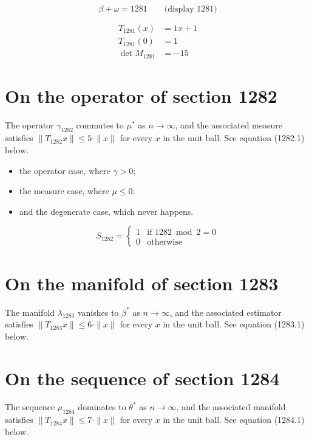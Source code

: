 \documentclass{article}
\begin{document}
$$
\beta + \omega = 1281 \qquad \text{(display 1281)}
$$

\begin{align}
T_{1281}(x) &= 1 x + 1 \\
T_{1281}(0) &= 1 \\
\det M_{1281} &= -15
\end{align}

\section{On the operator of section 1282}
The operator $\gamma_{1282}$ commutes to $\mu^{*}$ as $n \to \infty$,
and the associated measure satisfies $\|T_{1282} x\| \leq 5 \cdot \|x\|$
for every $x$ in the unit ball. See equation (1282.1) below.

\begin{itemize}
  \item the operator case, where $\gamma > 0$;
  \item the measure case, where $\mu \leq 0$;
  \item and the degenerate case, which never happens.
\end{itemize}

\begin{equation}
S_{1282} = \begin{cases} 1 & \text{if } 1282 \bmod 2 = 0 \\ 0 & \text{otherwise} \end{cases}
\end{equation}

\section{On the manifold of section 1283}
The manifold $\lambda_{1283}$ vanishes to $\beta^{*}$ as $n \to \infty$,
and the associated estimator satisfies $\|T_{1283} x\| \leq 6 \cdot \|x\|$
for every $x$ in the unit ball. See equation (1283.1) below.

\section{On the sequence of section 1284}
The sequence $\mu_{1284}$ dominates to $\theta^{*}$ as $n \to \infty$,
and the associated manifold satisfies $\|T_{1284} x\| \leq 7 \cdot \|x\|$
for every $x$ in the unit ball. See equation (1284.1) below.
\end{document}
